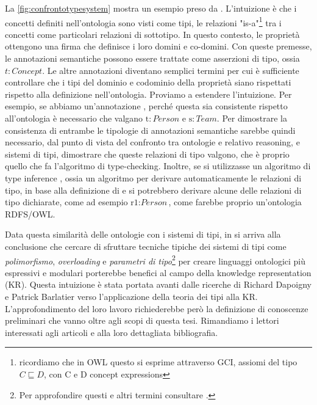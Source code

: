 La \autoref{fig:confrontotypesystem} mostra un esempio preso da \cite{despeyroux2008evolution}.
L'intuizione è che i concetti definiti nell'ontologia sono visti come tipi, le relazioni "is-a"\footnote{ricordiamo che in OWL questo si esprime attraverso GCI, assiomi del tipo $C \sqsubseteq D$, con C e D concept expressions} tra i concetti come particolari relazioni di sottotipo. In questo contesto, le proprietà ottengono una firma che definisce i loro domini e co-domini.
Con queste premesse, le annotazioni semantiche  possono essere trattate come asserzioni di tipo, ossia $t : \textit{Concept}$. Le altre annotazioni diventano semplici termini per cui è sufficiente controllare che i tipi del dominio e codominio della proprietà siano rispettati rispetto alla definizione nell'ontologia. 
Proviamo a estendere l'intuizione. Per esempio, se abbiamo un'annotazione , perché questa sia consistente rispetto all'ontologia è necessario che valgano $\text{t}: Person$ e $\text{s}: Team$. Per dimostrare la consistenza di entrambe le tipologie di annotazioni semantiche sarebbe quindi necessario, dal punto di vista del confronto tra ontologie e relativo reasoning, e sistemi di tipi, dimostrare che queste relazioni di tipo valgono, che è proprio quello che fa l'algoritmo di type-checking. Inoltre, se si utilizzasse un algoritmo di type inference \cite{cardoneTypeInference, martellimontanaritypeinference}, ossia un algoritmo per derivare automaticamente le  relazioni di tipo, in base alla definizione di  e  si potrebbero derivare alcune delle relazioni di tipo dichiarate, come ad esempio $\text{r1} : \textit{Person}$, come farebbe proprio un'ontologia RDFS/OWL.

Data questa similarità delle ontologie con i sistemi di tipi, in \cite{despeyroux2008evolution} si arriva alla conclusione che cercare di sfruttare tecniche tipiche dei sistemi di tipi come \textit{polimorfismo}, \textit{overloading} e \textit{parametri di tipo}\footnote{Per approfondire questi e altri termini consultare \cite{pierceTypesBook}.} per creare linguaggi ontologici più espressivi e modulari porterebbe benefici al campo della knowledge representation (KR). Questa intuizione è stata portata avanti dalle ricerche di Richard Dapoigny e Patrick Barlatier verso l'applicazione della teoria dei tipi alla KR. L'approfondimento del loro lavoro richiederebbe però la definizione di conoscenze preliminari che vanno oltre agli scopi di questa tesi. Rimandiamo i lettori interessati agli articoli \cite{dapoigny2011typetheoryKR, dapoigny2012typetheoryKR} e alla loro dettagliata bibliografia.

